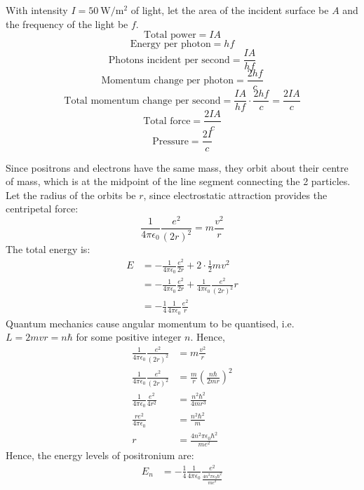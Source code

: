 \begin{solution}
    \begin{subsolution}
        With intensity \(I=\qty{50}{\W\per\square\m}\) of light, let the area of the incident surface be $A$ and the frequency of the light be $f$.
        \[\text{Total power}=IA\]
        \[\text{Energy per photon}=hf\]
        \[\text{Photons incident per second}=\frac{IA}{hf}\]
        \[\text{Momentum change per photon}=\frac{2hf}{c}\]
        \[\text{Total momentum change per second}=\frac{IA}{hf}\cdot \frac{2hf}{c}=\frac{2IA}{c}\]
        \[\text{Total force}=\frac{2IA}{c}\]
        \[\text{Pressure}=\boxed{\frac{2I}{c}}\]
    \end{subsolution}
    
    \begin{subsolution}
        Since positrons and electrons have the same mass, they orbit about their centre of mass, which is at the midpoint of the line segment connecting the 2 particles. Let the radius of the orbits be $r$, since electrostatic attraction provides the centripetal force:
        \[\frac{1}{4\pi\epsilon_0}\frac{e^2}{(2r)^2}=m\frac{v^2}{r}\]
        The total energy is:
        \begin{align*}
            E&=-\frac{1}{4\pi\epsilon_0}\frac{e^2}{2r}+2\cdot\frac{1}{2}mv^2\\
            &=-\frac{1}{4\pi\epsilon_0}\frac{e^2}{2r}+\frac{1}{4\pi\epsilon_0}\frac{e^2}{(2r)^2}r\\
            &=-\frac{1}{4}\frac{1}{4\pi\epsilon_0}\frac{e^2}{r}
        \end{align*}
        Quantum mechanics cause angular momentum to be quantised, i.e. \(L=2mvr=n\hbar\) for some positive integer $n$. Hence,
        \begin{align*}
            \frac{1}{4\pi\epsilon_0}\frac{e^2}{(2r)^2}&=m\frac{v^2}{r}\\
            \frac{1}{4\pi\epsilon_0}\frac{e^2}{(2r)^2}&=\frac{m}{r}\left(\frac{n\hbar}{2mr}\right)^2\\
            \frac{1}{4\pi\epsilon_0}\frac{e^2}{4r^2}&=\frac{n^2\hbar^2}{4mr^3}\\
            \frac{re^2}{4\pi\epsilon_0}&=\frac{n^2\hbar^2}{m}\\
            r&=\frac{4n^2\pi\epsilon_0\hbar^2}{me^2}
        \end{align*}
        Hence, the energy levels of positronium are:
        \begin{align*}
            E_n&=-\frac{1}{4}\frac{1}{4\pi\epsilon_0}\frac{e^2}{\frac{4n^2\pi\epsilon_0\hbar^2}{me^2}}\\

\end{align*}
\end{subsolution}
\end{solution}
